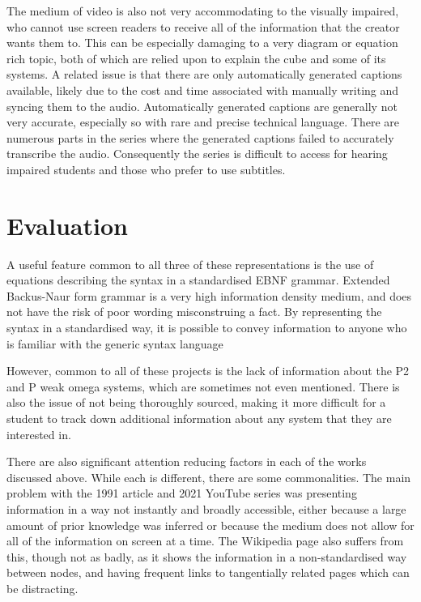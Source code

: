\documentclass{l4proj}
\begin{document}
The medium of video is also not very accommodating to the visually impaired, who cannot use screen readers to receive all of the information that the creator wants them to.  This can be especially damaging to a very diagram or equation rich topic, both of which are relied upon to explain the cube and some of its systems.  A related issue is that there are only automatically generated captions available, likely due to the cost and time associated with manually writing and syncing them to the audio.  Automatically generated captions are generally not very accurate, especially so with rare and precise technical language.  There are numerous parts in the series where the generated captions failed to accurately transcribe the audio.  Consequently the series is difficult to access for hearing impaired students and those who prefer to use subtitles.

\section{Evaluation}

A useful feature common to all three of these representations is the use of equations describing the syntax in a standardised EBNF grammar.  Extended Backus-Naur form grammar is a very high information density medium, and does not have the risk of poor wording misconstruing a fact.  By representing the syntax in a standardised way, it is possible to convey information to anyone who is familiar with the generic syntax language

However, common to all of these projects is the lack of information about the P2 and P weak omega systems, which are sometimes not even mentioned.  There is also the issue of not being thoroughly sourced, making it more difficult for a student to track down additional information about any system that they are interested in.

There are also significant attention reducing factors in each of the works discussed above.  While each is different, there are some commonalities.  The main problem with the 1991 article and 2021 YouTube series was presenting information in a way not instantly and broadly accessible, either because a large amount of prior knowledge was inferred or because the medium does not allow for all of the information on screen at a time.  The Wikipedia page also suffers from this, though not as badly, as it shows the information in a non-standardised way between nodes, and having frequent links to tangentially related pages which can be distracting.
\end{document}
